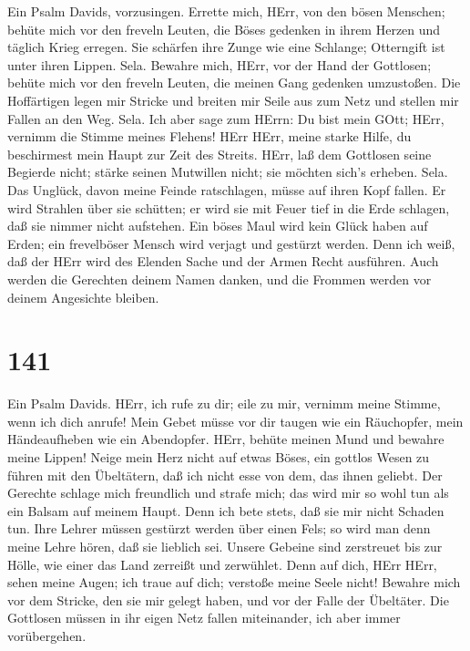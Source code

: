  Ein Psalm Davids, vorzusingen.  Errette mich,
HErr, von den bösen Menschen; behüte mich vor den freveln Leuten,
 die Böses gedenken in ihrem Herzen und täglich Krieg
erregen.  Sie schärfen ihre Zunge wie eine Schlange;
Otterngift ist unter ihren Lippen. Sela.  Bewahre mich,
HErr, vor der Hand der Gottlosen; behüte mich vor den freveln Leuten,
die meinen Gang gedenken umzustoßen.  Die Hoffärtigen legen
mir Stricke und breiten mir Seile aus zum Netz und stellen mir Fallen an
den Weg. Sela.  Ich aber sage zum HErrn: Du bist mein GOtt;
HErr, vernimm die Stimme meines Flehens!  HErr HErr, meine
starke Hilfe, du beschirmest mein Haupt zur Zeit des Streits.
 HErr, laß dem Gottlosen seine Begierde nicht; stärke seinen
Mutwillen nicht; sie möchten sich's erheben. Sela.  Das
Unglück, davon meine Feinde ratschlagen, müsse auf ihren Kopf fallen.
 Er wird Strahlen über sie schütten; er wird sie mit Feuer
tief in die Erde schlagen, daß sie nimmer nicht aufstehen. 
Ein böses Maul wird kein Glück haben auf Erden; ein frevelböser Mensch
wird verjagt und gestürzt werden.  Denn ich weiß, daß der
HErr wird des Elenden Sache und der Armen Recht ausführen. 
Auch werden die Gerechten deinem Namen danken, und die Frommen werden
vor deinem Angesichte bleiben.

\hypertarget{section-140}{%
\section{141}\label{section-140}}

 Ein Psalm Davids. HErr, ich rufe zu dir; eile zu mir,
vernimm meine Stimme, wenn ich dich anrufe!  Mein Gebet
müsse vor dir taugen wie ein Räuchopfer, mein Händeaufheben wie ein
Abendopfer.  HErr, behüte meinen Mund und bewahre meine
Lippen!  Neige mein Herz nicht auf etwas Böses, ein gottlos
Wesen zu führen mit den Übeltätern, daß ich nicht esse von dem, das
ihnen geliebt.  Der Gerechte schlage mich freundlich und
strafe mich; das wird mir so wohl tun als ein Balsam auf meinem Haupt.
Denn ich bete stets, daß sie mir nicht Schaden tun.  Ihre
Lehrer müssen gestürzt werden über einen Fels; so wird man denn meine
Lehre hören, daß sie lieblich sei.  Unsere Gebeine sind
zerstreuet bis zur Hölle, wie einer das Land zerreißt und zerwühlet.
 Denn auf dich, HErr HErr, sehen meine Augen; ich traue auf
dich; verstoße meine Seele nicht!  Bewahre mich vor dem
Stricke, den sie mir gelegt haben, und vor der Falle der Übeltäter.
 Die Gottlosen müssen in ihr eigen Netz fallen miteinander,
ich aber immer vorübergehen.


